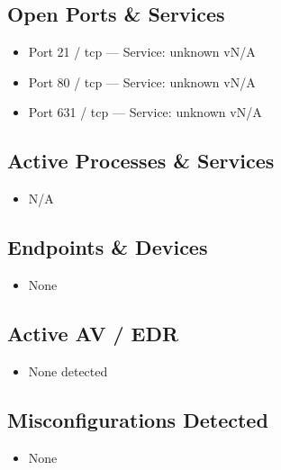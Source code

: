 \documentclass[a4paper,12pt]{article}
\begin{document}
\subsection*{Open Ports \& Services}
\begin{itemize}
    
    \item Port 21 / tcp — Service: unknown vN/A
    
    \item Port 80 / tcp — Service: unknown vN/A
    
    \item Port 631 / tcp — Service: unknown vN/A
    
\end{itemize}

\subsection*{Active Processes \& Services}
\begin{itemize}
    
        \item N/A
    
\end{itemize}

\subsection*{Endpoints \& Devices}
\begin{itemize}
    
        \item None
    
\end{itemize}

\subsection*{Active AV / EDR}
\begin{itemize}
    
        \item None detected
    
\end{itemize}

\subsection*{Misconfigurations Detected}
\begin{itemize}
    
        \item None
    
\end{itemize}
\end{document}
